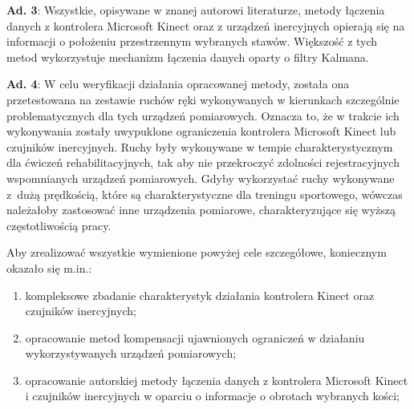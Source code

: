 \documentclass[10pt,a4paper]{article}
\begin{document}
\textbf{Ad. 3}: Wszystkie, opisywane w znanej autorowi literaturze, metody łączenia danych z kontrolera Microsoft Kinect oraz z urządzeń inercyjnych opierają się na informacji o położeniu przestrzennym wybranych stawów. Większość z tych metod wykorzystuje mechanizm łączenia danych oparty o filtry Kalmana.

\textbf{Ad. 4}: W celu weryfikacji działania opracowanej metody, została ona przetestowana na zestawie ruchów ręki wykonywanych w kierunkach szczególnie problematycznych dla tych urządzeń pomiarowych. Oznacza to, że w trakcie ich wykonywania zostały uwypuklone ograniczenia kontrolera Microsoft Kinect lub czujników inercyjnych. Ruchy były wykonywane w tempie charakterystycznym dla ćwiczeń rehabilitacyjnych, tak aby nie przekroczyć zdolności rejestracyjnych wspomnianych urządzeń pomiarowych. Gdyby wykorzystać ruchy wykonywane z~dużą prędkością, które są charakterystyczne dla treningu sportowego, wówczas należałoby zastosować inne urządzenia pomiarowe, charakteryzujące się wyższą częstotliwością pracy. 

Aby zrealizować wszystkie wymienione powyżej cele szczegółowe, koniecznym okazało się m.in.:
\begin{enumerate}[1. ]
	\item kompleksowe zbadanie charakterystyk działania kontrolera Kinect oraz czujników inercyjnych;
    \item opracowanie metod kompensacji ujawnionych ograniczeń w działaniu wykorzystywanych urządzeń pomiarowych;
	\item opracowanie autorskiej metody łączenia danych z kontrolera Microsoft Kinect i czujników inercyjnych w oparciu o informacje o obrotach wybranych kości;
\end{enumerate}
\end{document}
